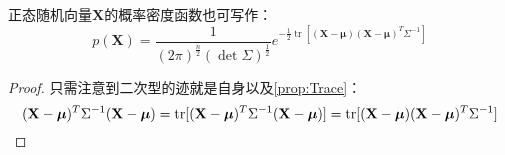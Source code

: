\begin{definition}\label{def:MultiNormalPDF2}
	正态随机向量$\mathbf{X}$的概率密度函数也可写作：
	\begin{equation*}
		p(\mathbf{X})=\frac{1}{(2\pi)^{\frac{n}{2}}(\det\Sigma)^{\frac{1}{2}}}e^{-\frac{1}{2}\operatorname{tr}[(\mathbf{X}-\boldsymbol{\mu})(\mathbf{X}-\boldsymbol{\mu})^T\Sigma^{-1}]}
	\end{equation*} 
\end{definition}
\begin{proof}
	只需注意到二次型的迹就是自身以及\cref{prop:Trace}：
	\begin{equation*}
		(\mathbf{X}-\boldsymbol{\mu})^T\Sigma^{-1}(\mathbf{X}-\boldsymbol{\mu})=\operatorname{tr}[(\mathbf{X}-\boldsymbol{\mu})^T\Sigma^{-1}(\mathbf{X}-\boldsymbol{\mu})]=\operatorname{tr}[(\mathbf{X}-\boldsymbol{\mu})(\mathbf{X}-\boldsymbol{\mu})^T\Sigma^{-1}]\qedhere
	\end{equation*}
\end{proof}
